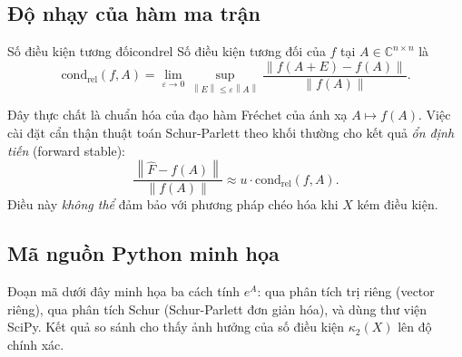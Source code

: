 \documentclass[12pt,a4paper]{report}
\newcommand{\C}{\mathbb{C}}
\newcommand{\norm}[1]{\left\lVert #1 \right\rVert}
\begin{document}
\subsection{Độ nhạy của hàm ma trận}

\begin{definition}{Số điều kiện tương đối}{condrel}
Số điều kiện tương đối của $f$ tại $A \in \C^{n \times n}$ là
\[
  \mathrm{cond}_{\mathrm{rel}}(f, A)
  = \lim_{\varepsilon \to 0}
    \sup_{\norm{E} \le \varepsilon \norm{A}}
    \frac{\norm{f(A+E) - f(A)}}{\norm{f(A)}}.
\]
\end{definition}

Đây thực chất là chuẩn hóa của đạo hàm Fréchet của ánh xạ $A \mapsto f(A)$.
Việc cài đặt cẩn thận thuật toán Schur-Parlett theo khối thường cho kết quả
\emph{ổn định tiến} (forward stable):
\[
  \frac{\norm{\hat{F} - f(A)}}{\norm{f(A)}} \approx u \cdot \mathrm{cond}_{\mathrm{rel}}(f,A).
\]
Điều này \emph{không thể} đảm bảo với phương pháp chéo hóa khi $X$ kém điều kiện.

\subsection{Mã nguồn Python minh họa}

Đoạn mã dưới đây minh họa ba cách tính $e^A$: qua phân tích trị riêng (vector riêng),
qua phân tích Schur (Schur-Parlett đơn giản hóa), và dùng thư viện SciPy. Kết quả
so sánh cho thấy ảnh hưởng của số điều kiện $\kappa_2(X)$ lên độ chính xác.
\end{document}

